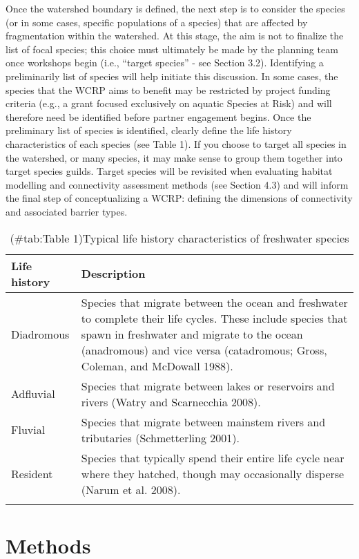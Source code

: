 \documentclass[
]{book}
\begin{document}
Once the watershed boundary is defined, the next step is to consider the species (or in some cases, specific populations of a species) that are affected by fragmentation within the watershed. At this stage, the aim is not to finalize the list of focal species; this choice must ultimately be made by the planning team once workshops begin (i.e., ``target species'' - see Section 3.2). Identifying a preliminarily list of species will help initiate this discussion. In some cases, the species that the WCRP aims to benefit may be restricted by project funding criteria (e.g., a grant focused exclusively on aquatic Species at Risk) and will therefore need be identified before partner engagement begins. Once the preliminary list of species is identified, clearly define the life history characteristics of each species (see Table 1). If you choose to target all species in the watershed, or many species, it may make sense to group them together into target species guilds. Target species will be revisited when evaluating habitat modelling and connectivity assessment methods (see Section 4.3) and will inform the final step of conceptualizing a WCRP: defining the dimensions of connectivity and associated barrier types.

\begin{table}

\caption{(\#tab:Table 1)Typical life history characteristics of freshwater species}
\centering
\begin{tabular}[t]{ll}
\toprule{}
Life history & Description\\
\midrule{}
Diadromous & Species that migrate between the ocean and freshwater to complete their life cycles. These include species that spawn in freshwater and migrate to the ocean (anadromous) and vice versa (catadromous; Gross, Coleman, and McDowall 1988).\\
Adfluvial & Species that migrate between lakes or reservoirs and rivers (Watry and Scarnecchia 2008).\\
Fluvial & Species that migrate between mainstem rivers and tributaries (Schmetterling 2001).\\
Resident & Species that typically spend their entire life cycle near where they hatched, though may occasionally disperse (Narum et al. 2008).\\
\bottomrule{}
\end{tabular}
\end{table}

\hypertarget{methods}{%
\chapter{Methods}\label{methods}}
\end{document}
